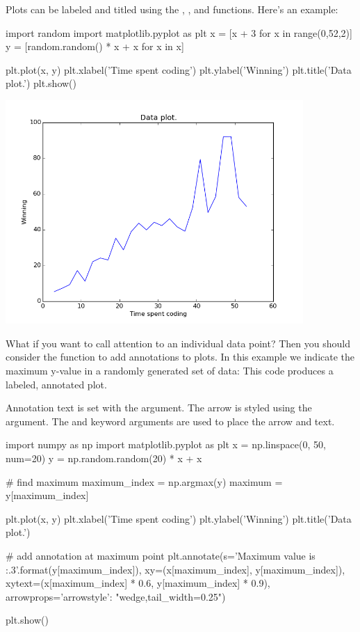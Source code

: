 \documentclass[11pt]{cselabheader}
\begin{document}
Plots can be labeled and titled using the
,
,
and  functions.
Here's an example:

\begin{python3code}
import random
import matplotlib.pyplot as plt
x = [x + 3 for x in range(0,52,2)]
y = [random.random() * x + x for x in x]

plt.plot(x, y)
plt.xlabel('Time spent coding')
plt.ylabel('Winning')
plt.title('Data plot.')
plt.show()
\end{python3code}

\begin{center}
  \includegraphics[width=0.85\textwidth]{img/matplotlib_labeled1.png}
\end{center}

What if you want to call attention to an individual data point? Then
you should consider the  function to add
annotations to plots.  In this example we indicate the maximum y-value
in a randomly generated set of data: This code produces a labeled,
annotated plot.

Annotation text is set with the  argument. The arrow
is styled using the  argument.  The
 and  keyword arguments are used
to place the arrow and text.

\begin{python3code}
import numpy as np
import matplotlib.pyplot as plt
x = np.linspace(0, 50, num=20)
y = np.random.random(20) * x + x

# find maximum
maximum_index = np.argmax(y)
maximum = y[maximum_index]

plt.plot(x, y)
plt.xlabel('Time spent coding')
plt.ylabel('Winning')
plt.title('Data plot.')

# add annotation at maximum point
plt.annotate(s='Maximum value is {:.3}'.format(y[maximum_index]),
             xy=(x[maximum_index], y[maximum_index]),
             xytext=(x[maximum_index] * 0.6, y[maximum_index] * 0.9),
             arrowprops={'arrowstyle': "wedge,tail_width=0.25"})

plt.show()
\end{python3code}
\end{document}
